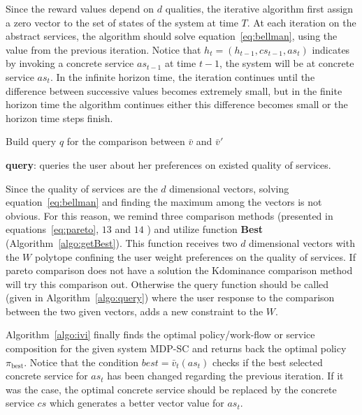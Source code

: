 \documentclass[10pt,journal,compsoc]{IEEEtran}
\begin{document}
Since the reward values depend on $d$ qualities, the iterative algorithm first assign a zero vector to the set of states of the system at time $T$. At each iteration on the abstract services, the algorithm should solve equation~\ref{eq:bellman}, using the value from the previous iteration. Notice that $h_t = (h_{t-1}, cs_{t-1}, as_t)$ indicates by invoking a concrete service $as_{t-1}$ at time $t-1$, the system will be at concrete service $as_t$. In the infinite horizon time, the iteration continues until the difference between successive values becomes extremely small, but in the finite horizon time the algorithm continues either this difference becomes small or the horizon time steps finish. 

\begin{algorithm}[]
Build query $q$ for the comparison between $\bar{v}$ and $\bar{v}'$ \\
\caption{\textbf{query}: queries the user about her preferences on existed quality of services.}
\end{algorithm}\label{algo:query}

Since the quality of services are the $d$ dimensional vectors, solving equation~\ref{eq:bellman} and finding the maximum among the vectors is not obvious. For this reason, we remind three comparison methods (presented in equations~\ref{eq:pareto}, $13$ and $14$ %
) and utilize function \textbf{Best} (Algorithm~\ref{algo:getBest}). This function receives two $d$ dimensional vectors with the $W$ polytope confining the user weight preferences on the quality of services. If pareto comparison does not have a solution the Kdominance comparison method will try this comparison out. Otherwise the query function should be called (given in Algorithm~\ref{algo:query}) where the user response to the comparison between the two given vectors, adds a new constraint to the $W$. 

 Algorithm~\ref{algo:ivi} finally finds the optimal policy/work-flow or service composition for the given system MDP-SC and returns back the optimal policy $\pi_{\text{best}}$. Notice that the condition $best = \bar{v}_t(as_t)$ checks if the best selected concrete service for $as_t$ has been changed regarding the previous iteration. If it was the case, the optimal concrete service should be replaced by the concrete service $cs$ which generates a better vector value for $as_t$. 
 
\end{document}
